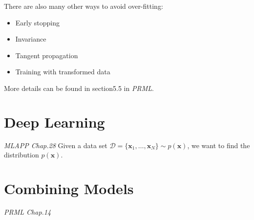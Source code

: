 \documentclass{article}
\newcommand{\mbf}{\mathbf}
\newcommand{\mcal}{\mathcal}
\newcommand{\xx}{\mbf x}
\newcommand{\tit}{\textit}
\begin{document}
There are also many other ways to avoid over-fitting:
\begin{itemize}
  \item Early stopping
  \item Invariance
  \item Tangent propagation
  \item Training with transformed data
\end{itemize}
More details can be found in section5.5 in \tit{PRML}.

\section{Deep Learning}
\emph{MLAPP Chap.28}
Given a data set $\mcal D = \{\xx_1,\dots, \xx_N\} \sim p(\xx)$, we want  to find the distribution $p(\xx)$. 


\section{Combining Models}
\emph{PRML Chap.14}
\end{document}
